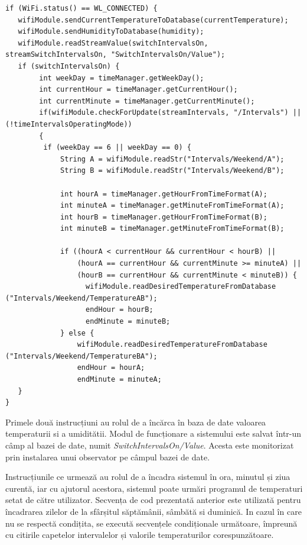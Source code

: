 \begin{lstlisting}
if (WiFi.status() == WL_CONNECTED) {
   wifiModule.sendCurrentTemperatureToDatabase(currentTemperature);
   wifiModule.sendHumidityToDatabase(humidity);
   wifiModule.readStreamValue(switchIntervalsOn, streamSwitchIntervalsOn, "SwitchIntervalsOn/Value");
   if (switchIntervalsOn) {
        int weekDay = timeManager.getWeekDay();
        int currentHour = timeManager.getCurrentHour();
        int currentMinute = timeManager.getCurrentMinute();
        if(wifiModule.checkForUpdate(streamIntervals, "/Intervals") || (!timeIntervalsOperatingMode))
        {
         if (weekDay == 6 || weekDay == 0) {
             String A = wifiModule.readStr("Intervals/Weekend/A");
             String B = wifiModule.readStr("Intervals/Weekend/B");

             int hourA = timeManager.getHourFromTimeFormat(A);
             int minuteA = timeManager.getMinuteFromTimeFormat(A);
             int hourB = timeManager.getHourFromTimeFormat(B);
             int minuteB = timeManager.getMinuteFromTimeFormat(B);

             if ((hourA < currentHour && currentHour < hourB) ||
                 (hourA == currentHour && currentMinute >= minuteA) ||
                 (hourB == currentHour && currentMinute < minuteB)) {
                   wifiModule.readDesiredTemperatureFromDatabase ("Intervals/Weekend/TemperatureAB");
                   endHour = hourB;
                   endMinute = minuteB;
             } else {
                 wifiModule.readDesiredTemperatureFromDatabase ("Intervals/Weekend/TemperatureBA");
                 endHour = hourA;
                 endMinute = minuteA;       
   }
} 
\end{lstlisting}

\vspace{2em}	

	Primele două instrucțiuni au rolul de a încărca în baza de date valoarea temperaturii si a umiditătii. Modul de funcționare a sistemului este salvat într-un câmp al bazei de date, numit \textit{SwitchIntervalsOn/Value}. Acesta este monitorizat prin instalarea unui observator pe câmpul bazei de date. 

	Instrucțiunile ce urmează au rolul de a încadra sistemul în ora, minutul și ziua curentă, iar cu ajutorul acestora, sistemul poate urmări programul de temperaturi setat de către utilizator. Secvența de cod prezentată anterior este utilizată pentru încadrarea zilelor de la sfârșitul săptămânii, sâmbătă si duminică. In cazul în care nu se respectă condițita, se execută secvențele condiționale următoare, împreună cu citirile capetelor intervalelor și valorile temperaturilor corespunzătoare.

